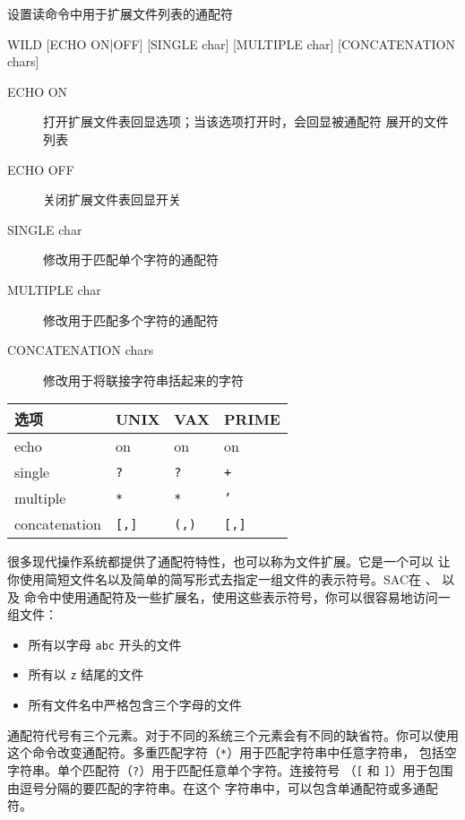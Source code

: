 \label{cmd:wild}

设置读命令中用于扩展文件列表的通配符

\begin{SACSTX}
WILD [ECHO ON|OFF] [SINGLE char] [MULTIPLE char] [CONCATENATION chars]
\end{SACSTX}

\begin{description}
\item [ECHO ON] 打开扩展文件表回显选项；当该选项打开时，会回显被通配符
    展开的文件列表
\item [ECHO OFF] 关闭扩展文件表回显开关
\item [SINGLE char] 修改用于匹配单个字符的通配符
\item [MULTIPLE char] 修改用于匹配多个字符的通配符
\item [CONCATENATION chars] 修改用于将联接字符串括起来的字符
\end{description}

\begin{center}
\begin{tabular}{llll}
\toprule
选项            &   UNIX    &   VAX     &   PRIME   \\
\midrule
echo            &   on      &   on      &   on      \\
single          & \texttt{?}& \texttt{?}& \texttt{+}\\
multiple        & \texttt{*}& \texttt{*}& \texttt{'}\\
concatenation   & \texttt{[,]}& \texttt{(,)}& \texttt{[,]}\\
\bottomrule
\end{tabular}
\end{center}

很多现代操作系统都提供了通配符特性，也可以称为文件扩展。它是一个可以
让你使用简短文件名以及简单的简写形式去指定一组文件的表示符号。SAC在
、 以及 
命令中使用通配符及一些扩展名，使用这些表示符号，你可以很容易地访问一组文件：
\begin{itemize}
\item 所有以字母 \texttt{abc} 开头的文件
\item 所有以 \texttt{z} 结尾的文件
\item 所有文件名中严格包含三个字母的文件
\end{itemize}

通配符代号有三个元素。对于不同的系统三个元素会有不同的缺省符。你可以使用
这个命令改变通配符。多重匹配字符（\texttt{*}）用于匹配字符串中任意字符串，
包括空字符串。单个匹配符（\texttt{?}）用于匹配任意单个字符。连接符号
（\texttt{[} 和 \texttt{]}）用于包围由逗号分隔的要匹配的字符串。在这个
字符串中，可以包含单通配符或多通配符。

